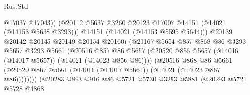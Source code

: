 \begin{lexlean}{RustStd}
\begin{coremodule}
                                            @17037
                                            @17043))
                                        (@20112
                                          @5637
                                          @3260
                                          @20123
                                          @17007
                                          @14151
                                          (@14021 (@14153 @5638 @3293)))
                                        @14151
                                        (@14021 (@14153 @5595 @5644)))
                                      @20139
                                      @20142
                                      @20145
                                      @20149
                                      @20154
                                      @20160)
                                    (@20167
                                      @5654
                                      @857
                                      @868
                                      @86
                                      @3293
                                      @5657
                                      @3293
                                      @5661
                                      (@20516
                                        @857
                                        @86
                                        @5657
                                        (@20520
                                          @856
                                          @5657
                                          (@14016 (@14017 @5657))
                                          (@14021 (@14023 @856 @86))))
                                      (@20516
                                        @868
                                        @86
                                        @5661
                                        (@20520
                                          @867
                                          @5661
                                          (@14016 (@14017 @5661))
                                          (@14021 (@14023 @867 @86))))))))
                              (@20283
                                @893
                                @916
                                @86
                                @5721
                                @5730
                                @3293
                                @5881
                                (@20293
                                  @5721
                                  @5728
                                  @4868

\end{coremodule}
\end{lexlean}
